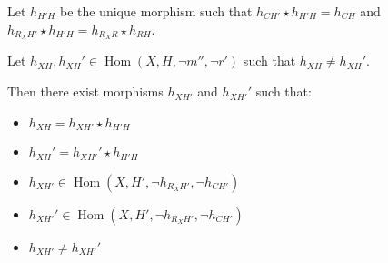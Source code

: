 \begin{lemma}
    \label{lem:2_distinct}





    Let \( h_{H'H} \) be the unique morphism such that \( h_{CH'} \mathop{\star} h_{H'H} \mathop{=} h_{CH} \) and \( h_{R_XH'} \mathop{\star} h_{H'H} \mathop{=} h_{R_XR} \mathop{\star} h_{RH} \). 

    Let \( h_{XH}, h_{XH}' \mathop{\in} \operatorname{Hom}(X, H, \lnot m'', \lnot r') \) such that \( h_{XH} \mathop{\neq} h_{XH}' \).
    
    Then there exist morphisms \( h_{XH'} \) and \( h_{XH'}' \) such that:
        \begin{itemize}
            \item \( h_{XH} \mathop{=} h_{XH'} \mathop{\star} h_{H'H} \)
            \item \( h_{XH}' \mathop{=} h_{XH'}' \mathop{\star} h_{H'H} \)
            \item \( h_{XH'} \mathop{\in} \operatorname{Hom}(X, H', \lnot h_{R_XH'}, \lnot h_{CH'}) \)
            \item \( h_{XH'}' \mathop{\in} \operatorname{Hom}(X, H', \lnot h_{R_XH'}, \lnot h_{CH'}) \)
            \item \( h_{XH'} \mathop{\neq} h_{XH'}' \)
        \end{itemize}    
\end{lemma}
  
